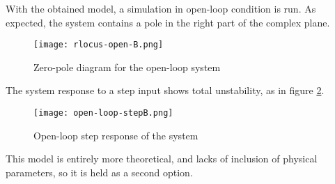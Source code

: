 With the obtained model, a simulation in open-loop condition is run. As expected, the system contains a pole in the right part of the complex plane.

\begin{figure}[h]
	\centering
	\texttt{[image: rlocus-open-B.png]}
	\caption{Zero-pole diagram for the open-loop system}\label{fig:zpB}
\end{figure}

The system response to a step input shows total unstability, as in figure \ref{fig:stepB}.

\begin{figure}[h]
	\centering
	\texttt{[image: open-loop-stepB.png]}
	\caption{Open-loop step response of the system}\label{fig:stepB}
\end{figure}

This model is entirely more theoretical, and lacks of inclusion of physical parameters, so it is held as a second option.
